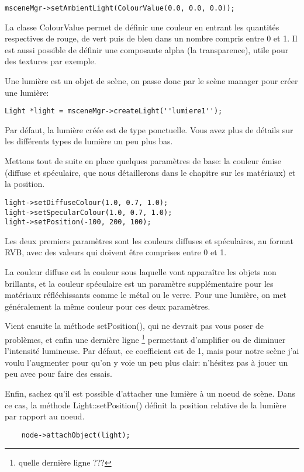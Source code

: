 \documentclass[10pt,a4paper]{report}
\begin{document}
\begin{lstlisting}
msceneMgr->setAmbientLight(ColourValue(0.0, 0.0, 0.0));
\end{lstlisting}



La classe ColourValue permet de d\'efinir une couleur en entrant les quantit\'es respectives de rouge, de vert puis de bleu dans un nombre compris entre 0 et 1. Il est aussi possible de d\'efinir une composante alpha (la transparence), utile pour des textures par exemple.

Une lumi\`ere est un objet de sc\`ene, on passe donc par le sc\`ene manager pour cr\'eer une lumi\`ere:
\begin{lstlisting}
Light *light = msceneMgr->createLight(''lumiere1'');
\end{lstlisting}

Par d\'efaut, la lumi\`ere cr\'e\'ee est de type ponctuelle. Vous avez plus de d\'etails sur les diff\'erents types de lumi\`ere un peu plus bas.

Mettons tout de suite en place quelques param\`etres de base: la couleur \'emise (diffuse et sp\'eculaire, que nous d\'etaillerons dans le chapitre sur les mat\'eriaux) et la position.
\begin{lstlisting}
light->setDiffuseColour(1.0, 0.7, 1.0);
light->setSpecularColour(1.0, 0.7, 1.0);
light->setPosition(-100, 200, 100);
\end{lstlisting}




Les deux premiers param\`etres sont les couleurs diffuses et sp\'eculaires, au format RVB, avec des valeurs qui doivent \^etre comprises entre 0 et 1.

La couleur diffuse est la couleur sous laquelle vont appara\^itre les objets non brillants, et la couleur sp\'eculaire est un param\`etre suppl\'ementaire pour les mat\'eriaux r\'efl\'echissants comme le m\'etal ou le verre. Pour une lumi\`ere, on met g\'en\'eralement la m\^eme couleur pour ces deux param\`etres.

Vient ensuite la m\'ethode setPosition(), qui ne devrait pas vous poser de probl\`emes, et enfin une derni\`ere ligne \footnote{quelle derni\`ere ligne ???} permettant d'amplifier ou de diminuer l'intensit\'e lumineuse. Par d\'efaut, ce coefficient est de 1, mais pour notre sc\`ene j'ai voulu l'augmenter pour qu'on y voie un peu plus clair: n'h\'esitez pas \`{a} jouer un peu avec pour faire des essais.

Enfin, sachez qu'il est possible d'attacher une lumi\`ere \`{a} un noeud de sc\`ene. Dans ce cas, la m\'ethode Light::setPosition() d\'efinit la position relative de la lumi\`ere par rapport au noeud.
\begin{lstlisting}
	node->attachObject(light);
\end{lstlisting}
\end{document}
